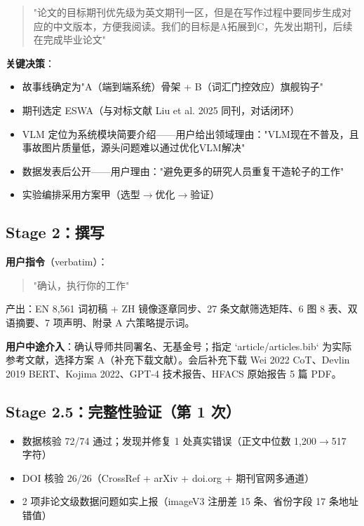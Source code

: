 \documentclass[11pt]{article}
\begin{document}
\begin{quote}"{\cjkfont 论文的目标期刊优先级为英文期刊一区，但是在写作过程中要同步生成对应的中文版本，方便我阅读。我们的目标是}A{\cjkfont 拓展到}C{\cjkfont ，先发出期刊，后续在完成毕业论文}"\end{quote}

\textbf{{\cjkfont 关键决策}}{\cjkfont ：}

\begin{itemize}
\item {\cjkfont 故事线确定为}"A{\cjkfont （端到端系统）骨架} + B{\cjkfont （词汇门控效应）旗舰钩子}"
\item {\cjkfont 期刊选定} ESWA{\cjkfont （与对标文献} Liu et al. 2025 {\cjkfont 同刊，对话闭环）}
\item VLM {\cjkfont 定位为系统模块简要介绍}------{\cjkfont 用户给出领域理由：}"VLM{\cjkfont 现在不普及，且事故图片质量低，源头问题难以通过优化}VLM{\cjkfont 解决}"
\item {\cjkfont 数据发表后公开}------{\cjkfont 用户理由：}"{\cjkfont 避免更多的研究人员重复干造轮子的工作}"
\item {\cjkfont 实验编排采用方案甲（选型}$\rightarrow${\cjkfont 优化}$\rightarrow${\cjkfont 验证）}
\end{itemize}
\subsection{Stage 2{\cjkfont ：撰写}}
\textbf{{\cjkfont 用户指令}}{\cjkfont （}verbatim{\cjkfont ）：}

\begin{quote}"{\cjkfont 确认，执行你的工作}"\end{quote}

{\cjkfont 产出：}EN 8,561 {\cjkfont 词初稿} + ZH {\cjkfont 镜像逐章同步、}27 {\cjkfont 条文献筛选矩阵、}6 {\cjkfont 图} 8 {\cjkfont 表、双语摘要、}7 {\cjkfont 项声明、附录} A {\cjkfont 六策略提示词。}

\textbf{{\cjkfont 用户中途介入}}{\cjkfont ：确认导师共同署名、无基金号；指定} `article/articles.bib` {\cjkfont 为实际参考文献，选择方案} A{\cjkfont （补充下载文献）。会后补充下载} Wei 2022 CoT{\cjkfont 、}Devlin 2019 BERT{\cjkfont 、}Kojima 2022{\cjkfont 、}GPT-4 {\cjkfont 技术报告、}HFACS {\cjkfont 原始报告} 5 {\cjkfont 篇} PDF{\cjkfont 。}

\subsection{Stage 2.5{\cjkfont ：完整性验证（第} 1 {\cjkfont 次）}}
\begin{itemize}
\item {\cjkfont 数据核验} 72/74 {\cjkfont 通过；发现并修复} 1 {\cjkfont 处真实错误（正文中位数} 1,200$\rightarrow$517 {\cjkfont 字符）}
\item DOI {\cjkfont 核验} 26/26{\cjkfont （}CrossRef + arXiv + doi.org + {\cjkfont 期刊官网多通道）}
\item 2 {\cjkfont 项非论文级数据问题如实上报（}imageV3 {\cjkfont 注册差} 15 {\cjkfont 条、省份字段} 17 {\cjkfont 条地址错值）}
\end{itemize}
\end{document}
